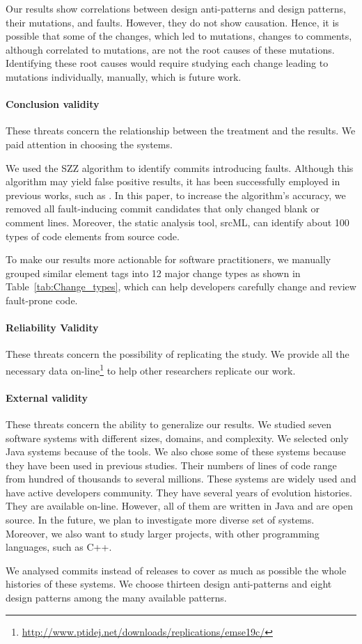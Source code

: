 Our results show correlations between design anti-patterns and design patterns, their mutations, and faults. However, they do not show causation. Hence, it is possible that some of the changes, which led to mutations, \eg{} changes to comments, although correlated to mutations, are not the root causes of these mutations. Identifying these root causes would require studying each change leading to mutations individually, manually, which is future work.



\paragraph{Conclusion validity} These threats concern the relationship between the treatment and the results. We paid attention in choosing the systems.

We used the SZZ algorithm \cite{sliwerski2005changes} to identify commits introducing faults. Although this algorithm may yield false positive results, it has been successfully employed in previous works, such as \cite{kamei2013large,fukushima2014empirical}. In this paper, to increase the algorithm's accuracy, we removed all fault-inducing commit candidates that only changed blank or comment lines. Moreover, the static analysis tool, srcML, can identify about 100 types of code elements from source code.

To make our results more actionable for software practitioners, we manually grouped similar element tags into 12 major change types as shown in Table~\ref{tab:Change_types}, which can help developers carefully change and review fault-prone code.



\paragraph{Reliability Validity} These threats concern the possibility of replicating the study. We provide all the necessary data on-line\footnote{\url{http://www.ptidej.net/downloads/replications/emse19c/}} to help other researchers replicate our work.



\paragraph{External validity} These threats concern the ability to generalize our results. We studied seven software systems with different sizes, domains, and complexity. We selected only Java systems because of the tools. We also chose some of these systems because they have been used in previous studies. Their numbers of lines of code range from hundred of thousands to several millions. These systems are widely used and have active developers community. They have several years of evolution histories. They are available on-line. However, all of them are written in Java and are open source. In the future, we plan to investigate more diverse set of systems. Moreover, we also want to study larger projects, with other programming languages, such as C++. 

We analysed commits instead of releases to cover as much as possible the whole histories of these systems. We choose thirteen design anti-patterns and eight design patterns among the many available patterns.
